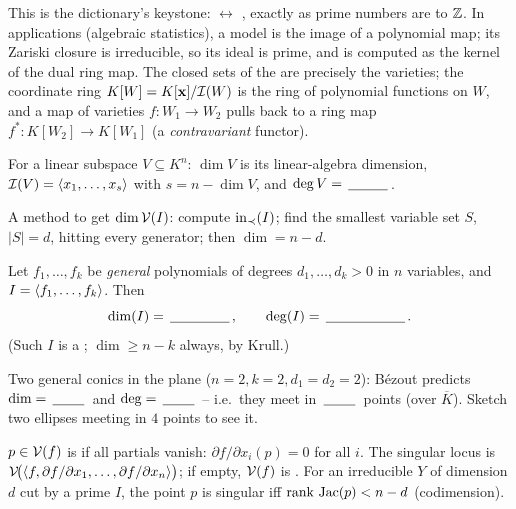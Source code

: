 \begin{strand}
This is the dictionary's keystone:  $\leftrightarrow$ , exactly as prime numbers are to $\Z$. In applications (algebraic statistics), a model is
the image of a polynomial map; its Zariski closure is irreducible, so its ideal is prime, and is
computed as the kernel of the dual ring map. The closed sets of the  are
precisely the varieties; the coordinate ring $K[W]=K[\xb]/\Ideal(W)$ is the ring of polynomial
functions on $W$, and a map of varieties $f:W_1\to W_2$ pulls back to a ring map
$f^\ast:K[W_2]\to K[W_1]$ (a \emph{contravariant} functor).
\end{strand}


\begin{example}
For a linear subspace $V\subseteq K^n$: $\dim V$ is its linear-algebra dimension, $\Ideal(V)=
\gen{x_1,\dots,x_s}$ with $s=n-\dim V$, and $\deg V=\fillin[1cm]$. 
\end{example}

A method to get $\dim\V(I)$: compute $\inn_\prec(I)$; find the smallest variable set $S$, $|S|=d$, hitting
every generator; then $\dim=n-d$.

\begin{theorem}\label{thm:bezout}
Let $f_1,\dots,f_k$ be \emph{general} polynomials of degrees $d_1,\dots,d_k>0$ in $n$ variables, and
$I=\gen{f_1,\dots,f_k}$. Then
\[
  \dim(I)=\fillin[1.5cm],\qquad \deg(I)=\fillin[2cm].
\]
(Such $I$ is a ; $\dim\ge n-k$ always, by Krull.)
\end{theorem}
\begin{yourturn}
Two general conics in the plane ($n=2,k=2,d_1=d_2=2$): Bézout predicts $\dim=\fillin[0.8cm]$ and
$\deg=\fillin[0.8cm]$ -- i.e.\ they meet in $\fillin[0.8cm]$ points (over $\overline K$). Sketch two
ellipses meeting in $4$ points to see it.
\end{yourturn}


\begin{definition}
$p\in\V(f)$ is  if all partials vanish: $\partial f/\partial x_i(p)=0$ for all $i$.
The singular locus is $\V\!\big(\gen{f,\partial f/\partial x_1,\dots,\partial f/\partial x_n}\big)$; if
empty, $\V(f)$ is . For an irreducible $Y$ of dimension $d$ cut by a prime $I$, the point
$p$ is singular iff $\rank\,\mathrm{Jac}(p)<n-d$ (codimension).
\end{definition}


